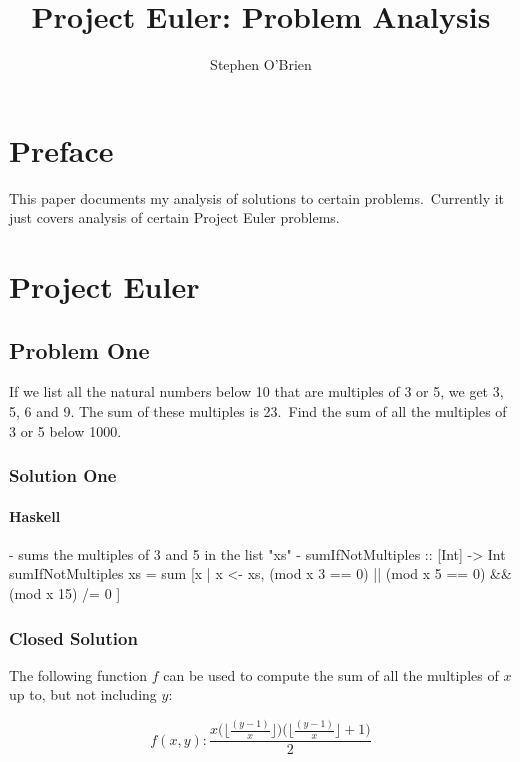\documentclass[11pt,a4paper]{report}
\title{Project Euler: Problem Analysis}
\author{Stephen O'Brien}
\begin{document}
	\maketitle
	\tableofcontents
	
	\chapter*{Preface}
		This paper documents my analysis of solutions to certain problems.\
		Currently it just covers analysis of certain Project Euler problems.


	
	\chapter{Project Euler}			
	    \section{Problem One}
	        If we list all the natural numbers below 10 that are multiples of 3 or 5, we get 3, 5, 6 and 9. The sum of these multiples is 23.\
            Find the sum of all the multiples of 3 or 5 below 1000.
	            
		        \subsection{Solution One}
		            \subsubsection{Haskell}
	                	\begin{haskellCode}
{-
    sums the multiples of 3 and 5 in the list "xs" 
-}
sumIfNotMultiples :: [Int] -> Int
sumIfNotMultiples xs = sum [x | x <- xs, (mod x 3 == 0) 
                           || (mod x 5 == 0) && (mod x 15) /= 0 ]
	
	        			\end{haskellCode}

		        \subsection{Closed Solution}
		            The following function $f$ can be used to compute the sum of all the multiples of $x$ up to, but not including $y$:
		            
                    \[ f(x,y) : \frac{x \Big(\Big\lfloor \frac{(y - 1)}{x} \Big\rfloor \Big) \Big(\Big\lfloor \frac{(y - 1)}{x} \Big\rfloor + 1 \Big)}{2}\]
                    
\end{document}
